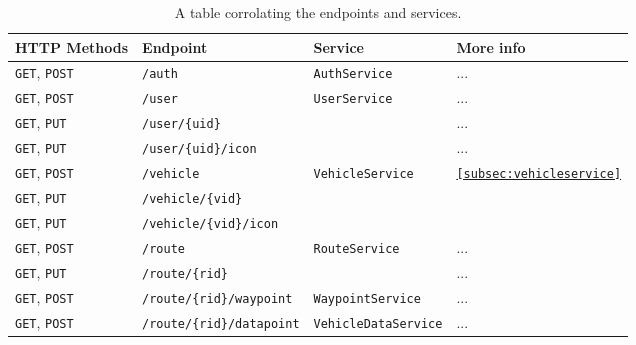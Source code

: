 \begin{table}[ht]
    \centering
    \small
    \setlength\extrarowheight{1pt}
    \begin{tabularx}{0.9\textwidth}{l p{13em} l l}
        \textbf{HTTP Methods}       & \textbf{Endpoint}               & \textbf{Service}             & \textbf{More info}  \\ \hline
        \texttt{GET}, \texttt{POST} & \texttt{/auth}                    & \texttt{AuthService}         & ... \\ \tblgrpsep
        \texttt{GET}, \texttt{POST} & \texttt{/user}                    & \multirow{3}{*}{\texttt{UserService}}         & ... \\
        \texttt{GET}, \texttt{PUT}  & \texttt{/user/\{uid\}}            &          & ... \\
        \texttt{GET}, \texttt{PUT}  & \texttt{/user/\{uid\}/icon}       &          & ... \\ \tblgrpsep

        \texttt{GET}, \texttt{POST} & \texttt{/vehicle}                 & \multirow{3}{*}{\texttt{VehicleService}}      & \multirow{3}{*}{\texttt{\cref{subsec:vehicleservice}}} \\
        \texttt{GET}, \texttt{PUT}  & \texttt{/vehicle/\{vid\}}         &       &  \\
        \texttt{GET}, \texttt{PUT}  & \texttt{/vehicle/\{vid\}/icon}    &       &  \\ \tblgrpsep

        \texttt{GET}, \texttt{POST} & \texttt{/route}                   & \multirow{2}{*}{\texttt{RouteService}}        & ... \\
        \texttt{GET}, \texttt{PUT}  & \texttt{/route/\{rid\}}           &        & ... \\
        \texttt{GET}, \texttt{POST} & \texttt{/route/\{rid\}/waypoint}  & \texttt{WaypointService}     & ... \\
        \texttt{GET}, \texttt{POST} & \texttt{/route/\{rid\}/datapoint} & \texttt{VehicleDataService}  & ... \\ 
    \end{tabularx}
    \caption{A table corrolating the endpoints and services.}\label{table:endpointservice}
\end{table}

